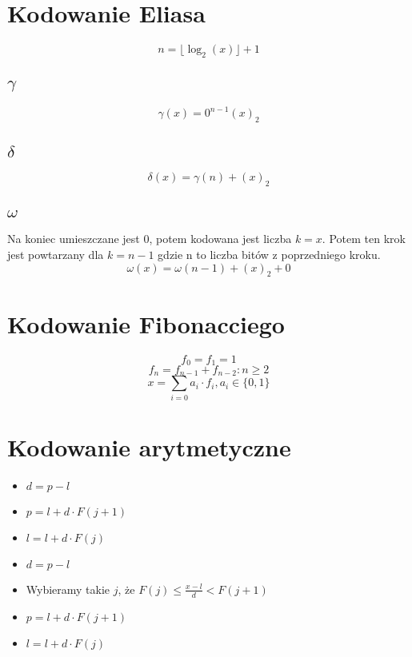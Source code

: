 \documentclass{../notatki}
\begin{document}
\begin{multicols}{2}
  \section{Kodowanie Eliasa}

  $$
  n = \lfloor \log_2(x) \rfloor + 1
  $$

  \subsection{\texorpdfstring{$\gamma$}{Gamma}}

  $$
  \gamma(x) = 0^{n-1}(x)_2
  $$

  \subsection{\texorpdfstring{$\delta$}{Delta}}

  $$
  \delta(x) = \gamma(n) + (x)_2
  $$

  \subsection{\texorpdfstring{$\omega$}{Omega}}

  Na koniec umieszczane jest $0$, potem kodowana jest liczba $k=x$. Potem ten
  krok jest powtarzany dla $k=n - 1$ gdzie n to liczba bitów z
  poprzedniego kroku.
  $$
  \omega(x) = \omega(n - 1) + (x)_2 + 0
  $$

  \section{Kodowanie Fibonacciego}

  $$
  f_0=f_1=1
  $$
  $$
  f_n = f_{n-1} + f_{n-2}: n \geq 2
  $$
  $$
  x = \sum_{i=0} a_i \cdot f_i, a_i \in \{0,1\}
  $$

  \section{Kodowanie arytmetyczne}
  \begin{multicols}{2}
    \begin{itemize}
      \item $d = p - l$
      \item $p = l + d \cdot F(j + 1)$
      \item $l = l + d \cdot F(j)$
    \end{itemize}

    \begin{itemize}
      \item $d = p - l$
      \item Wybieramy takie $j$, że $F(j) \leq \frac{x - l}{d} < F(j + 1)$
      \item $p = l + d \cdot F(j + 1)$
      \item $l = l + d \cdot F(j)$
    \end{itemize}
  \end{multicols}


\end{multicols}
\end{document}
